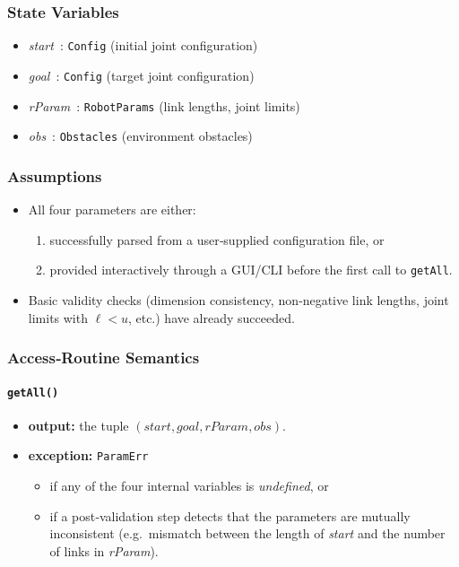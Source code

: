 \documentclass[12pt, titlepage]{article}
\begin{document}
\subsubsection{State Variables}
\begin{itemize}
  \item \textit{start} : \texttt{Config} \hfill (initial joint configuration)
  \item \textit{goal} : \texttt{Config} \hfill (target joint configuration)
  \item \textit{rParam} : \texttt{RobotParams} \hfill (link lengths, joint limits)
  \item \textit{obs} : \texttt{Obstacles} \hfill (environment obstacles)
\end{itemize}

\subsubsection{Assumptions}
\begin{itemize}
  \item All four parameters are either:
    \begin{enumerate}
      \item successfully parsed from a user‑supplied configuration file, or
      \item provided interactively through a GUI/CLI before the first call to
            \texttt{getAll}.
    \end{enumerate}
  \item Basic validity checks (dimension consistency, non‑negative link
        lengths, joint limits with $\ell < u$, etc.) have already succeeded.
\end{itemize}

\subsubsection{Access‑Routine Semantics}

\paragraph{\texttt{getAll()}}
\begin{itemize}
  \item \textbf{output:} the tuple
        $(\textit{start},\textit{goal},\textit{rParam},\textit{obs})$.
  \item \textbf{exception:} \texttt{ParamErr}  
        \begin{itemize}
          \item if any of the four internal variables is \emph{undefined}, or
          \item if a post‑validation step detects that the parameters are
                mutually inconsistent (e.g.\ mismatch between the length of
                \textit{start} and the number of links in \textit{rParam}).
        \end{itemize}
\end{itemize}
\end{document}
